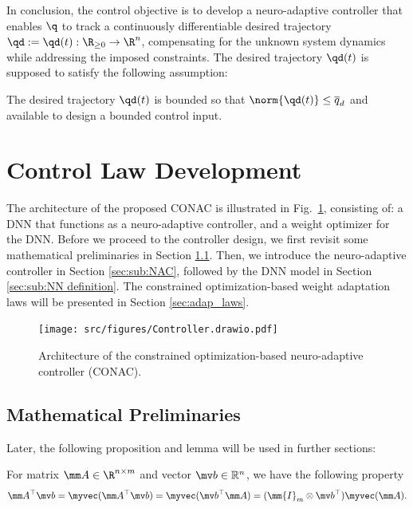 \documentclass[lettersize,journal]{IEEEtran}
\begin{document}
In conclusion, the control objective is to develop a neuro-adaptive controller that enables $\q$ to track a continuously differentiable desired trajectory $\qd:=\qd(t): \R_{\ge0} \to \R^n$, compensating for the unknown system dynamics while addressing the imposed constraints.
The desired trajectory $\qd(t)$ is supposed to satisfy the following assumption:
\begin{assum}
    The desired trajectory $\qd(t)$ is bounded so that $\norm{\qd(t)}\le \overline{q}_d$ and available to design a bounded control input. 
    \label{assum:feasible}
\end{assum}

\section{Control Law Development}\label{sec:ctrl design}

The architecture of the proposed CONAC is illustrated in Fig.~\ref{fig:ctrl:diagram}, consisting of: a DNN that functions as a neuro-adaptive controller, and a weight optimizer for the DNN. 
Before we proceed to the controller design, we first revisit some mathematical preliminaries in Section \ref{sec:sub:math preliminaries}. 
Then, we introduce the neuro-adaptive controller in Section \ref{sec:sub:NAC}, followed by the DNN model in Section \ref{sec:sub:NN definition}. 
The constrained optimization-based weight adaptation laws will be presented in Section \ref{sec:adap_laws}.

\begin{figure}[!t]
    \centering
    \texttt{[image: src/figures/Controller.drawio.pdf]}
    \caption{Architecture of the constrained optimization-based neuro-adaptive controller (CONAC).}
    \label{fig:ctrl:diagram}
\end{figure}

\subsection{Mathematical Preliminaries}\label{sec:sub:math preliminaries}

Later, the following proposition and lemma will be used in further sections:

\begin{propsit} \label{propsit:kron}
	For matrix $\mm A\in\R^{n\times m}$ and vector $\mv b\in\mathbb R^n$, we have the following property
	\begin{equation}
		\mm A^\top \mv b 
		= 
		\myvec(\mm A^\top\mv b)
		=
		\myvec(\mv b^\top\mm A)
		= 
		(\mm{I}_{m}\otimes \mv b^\top) \myvec(\mm A)
		.
	\end{equation}
\end{propsit}
\end{document}

